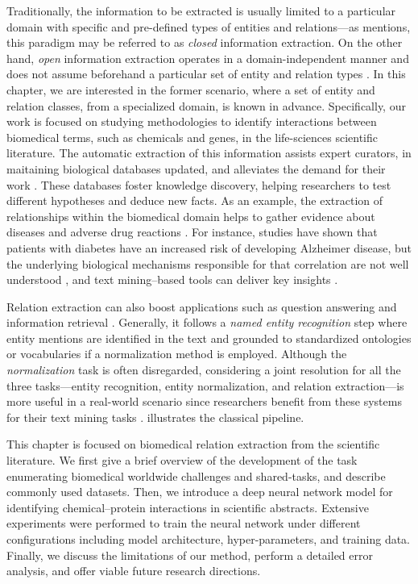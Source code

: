 Traditionally, the information to be extracted is usually limited to a particular domain with specific and pre-defined types of entities and relations---as \textcite{balog2018a} mentions, this paradigm may be referred to as \textit{closed} information extraction.
On the other hand, \textit{open} information extraction operates in a domain-independent manner and does not assume beforehand a particular set of entity and relation types \parencite{banko2007a,soderland2010a,balog2018a}.
In this chapter, we are interested in the former scenario, where a set of entity and relation classes, from a specialized domain, is known in advance.
Specifically, our work is focused on studying  methodologies to identify interactions between biomedical terms, such as chemicals and genes, in the life-sciences scientific literature.
The automatic extraction of this information assists expert curators, in maitaining biological databases updated, and alleviates the demand for their work \parencite{yeh2003a,cotton2007a,singhal2016a}.
These databases foster knowledge discovery, helping researchers to test different hypotheses and deduce new facts.
As an example, the extraction of relationships within the biomedical domain helps to gather evidence about diseases and adverse drug reactions \parencite{gonzalezhernandez2022a}.
For instance, studies have shown that patients with diabetes have an increased risk of developing Alzheimer disease, but the underlying biological mechanisms responsible for that correlation are not well understood \parencite{simsrobinson2010a}, and text mining--based tools can deliver key insights \parencite{saik2021a}.

Relation extraction can also boost applications such as question answering \parencite{wang2012a} and information retrieval \parencite{mcdonald2005a}.
Generally, it follows a \textit{named entity recognition} step where entity mentions are identified in the text and grounded to standardized ontologies or vocabularies if a normalization method is employed.
Although the \textit{normalization} task is often disregarded, considering a joint resolution for all the three tasks---entity recognition, entity normalization, and relation extraction---is more useful in a real-world scenario \parencite{yaseen2019a} since researchers benefit from these systems for their text mining tasks \parencite{kim2019a}.
 illustrates the classical  pipeline.



This chapter is focused on biomedical relation extraction from the scientific literature.
We first give a brief overview of the development of the  task enumerating biomedical  worldwide challenges and shared-tasks, and describe commonly used datasets.
Then, we introduce a deep neural network model for identifying chemical--protein interactions in  scientific abstracts.
Extensive experiments were performed to train the neural network under different configurations including model architecture, hyper-parameters, and training data.
Finally, we discuss the limitations of our method, perform a detailed error analysis, and offer viable future research directions.


